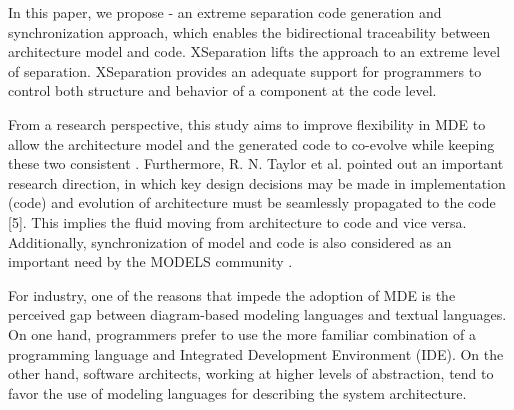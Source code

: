 In this paper, we propose  - an extreme separation code generation and synchronization approach, which enables the bidirectional traceability between architecture model 
 and code.
XSeparation lifts the  approach to an extreme level of separation.
XSeparation provides an adequate support for programmers to control both structure and behavior of a component at the code level. %



From a research perspective, this study aims to improve flexibility in MDE to allow the architecture model and the generated code to co-evolve while keeping these two consistent \cite{yu2012maintaining}. 
Furthermore, R. N. Taylor et al. \cite{Taylor:2007:SDA:1253532.1254721} pointed out an important research direction, in which key design decisions may be made in implementation (code) and evolution of architecture must be seamlessly propagated to the code [5]. 
This implies the fluid moving from architecture to code and vice versa. Additionally, synchronization of model and code is also considered as an important need by the MODELS community \cite{van2008challenges}.

For industry, one of the reasons that impede the adoption of MDE is the perceived gap between diagram-based modeling languages and textual languages. On one hand, programmers prefer to use the more familiar combination of a programming language and Integrated Development Environment (IDE). On the other hand, software architects, working at higher levels of abstraction, tend to favor the use of modeling languages for describing the system architecture.


